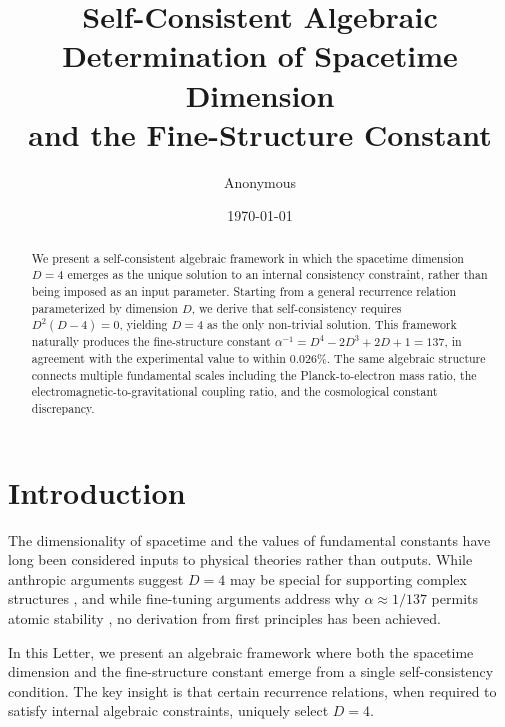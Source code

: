 \documentclass[twocolumn,showpacs,preprintnumbers,amsmath,amssymb,prl]{revtex4-2}
\begin{document}

\title{Self-Consistent Algebraic Determination of Spacetime Dimension\\
and the Fine-Structure Constant}

\author{Anonymous}

\date{\today}

\begin{abstract}
We present a self-consistent algebraic framework in which the spacetime dimension $D=4$ emerges as the unique solution to an internal consistency constraint, rather than being imposed as an input parameter. Starting from a general recurrence relation parameterized by dimension $D$, we derive that self-consistency requires $D^2(D-4)=0$, yielding $D=4$ as the only non-trivial solution. This framework naturally produces the fine-structure constant $\alpha^{-1} = D^4 - 2D^3 + 2D + 1 = 137$, in agreement with the experimental value to within 0.026\%. The same algebraic structure connects multiple fundamental scales including the Planck-to-electron mass ratio, the electromagnetic-to-gravitational coupling ratio, and the cosmological constant discrepancy.
\end{abstract}


\maketitle

\section{Introduction}

The dimensionality of spacetime and the values of fundamental constants have long been considered inputs to physical theories rather than outputs. While anthropic arguments suggest $D=4$ may be special for supporting complex structures \cite{Barrow1986}, and while fine-tuning arguments address why $\alpha \approx 1/137$ permits atomic stability \cite{Barrow2002}, no derivation from first principles has been achieved.

In this Letter, we present an algebraic framework where both the spacetime dimension and the fine-structure constant emerge from a single self-consistency condition. The key insight is that certain recurrence relations, when required to satisfy internal algebraic constraints, uniquely select $D=4$.
\end{document}
